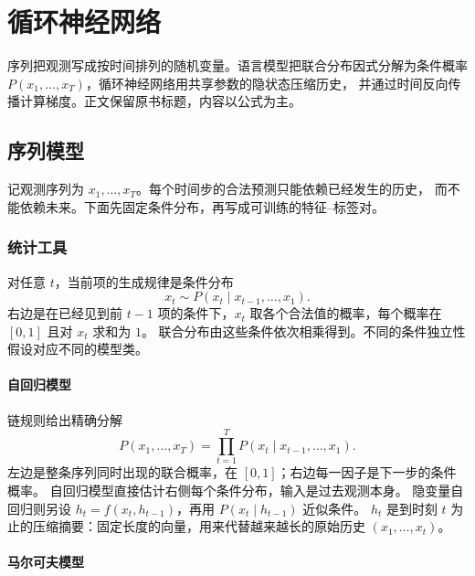 \chapter{循环神经网络}

序列把观测写成按时间排列的随机变量。语言模型把联合分布因式分解为条件概率
$P(x_1,\ldots,x_T)$，循环神经网络用共享参数的隐状态压缩历史，
并通过时间反向传播计算梯度。正文保留原书标题，内容以公式为主。

\section{序列模型}




记观测序列为 $x_1,\ldots,x_T$。每个时间步的合法预测只能依赖已经发生的历史，
而不能依赖未来。下面先固定条件分布，再写成可训练的特征--标签对。

\subsection{统计工具}

对任意 $t$，当前项的生成规律是条件分布
\[
x_t \sim P(x_t \mid x_{t-1},\ldots,x_1).
\]
右边是在已经见到前 $t-1$ 项的条件下，$x_t$ 取各个合法值的概率，每个概率在 $[0,1]$ 且对 $x_t$ 求和为 $1$。
联合分布由这些条件依次相乘得到。不同的条件独立性假设对应不同的模型类。

\subsubsection{自回归模型}

链规则给出精确分解
\[
P(x_1,\ldots,x_T)=\prod_{t=1}^{T}P(x_t \mid x_{t-1},\ldots,x_1).
\]
左边是整条序列同时出现的联合概率，在 $[0,1]$；右边每一因子是下一步的条件概率。
自回归模型直接估计右侧每个条件分布，输入是过去观测本身。
隐变量自回归则另设 $h_t=f(x_t,h_{t-1})$，再用 $P(x_t \mid h_{t-1})$ 近似条件。
$h_t$ 是到时刻 $t$ 为止的压缩摘要：固定长度的向量，用来代替越来越长的原始历史 $(x_1,\ldots,x_t)$。

\subsubsection{马尔可夫模型}

